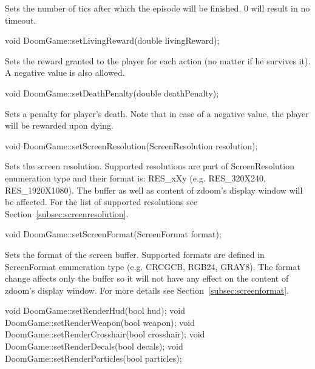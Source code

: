 \documentclass[english,bachelor,a4paper,twoside]{ppfcmthesis}
\begin{document}
Sets the number of tics after which the episode will be finished. 0 will result in no timeout.


\vspace{20pt}
\begin{clinee}
void DoomGame::setLivingReward(double livingReward);
\end{clinee}

Sets the reward granted to the player for each action (no matter if he survives it). A negative value is also allowed.


\vspace{20pt}
\begin{clinee}
void DoomGame::setDeathPenalty(double deathPenalty);
\end{clinee}

	Sets a penalty for player's death. Note that in case of a negative value, the player will be rewarded upon dying.


\vspace{20pt}
\begin{clinee}
void DoomGame::setScreenResolution(ScreenResolution resolution);
\end{clinee}

	Sets the screen resolution. Supported resolutions are part of ScreenResolution enumeration type and their format is: RES\_xXy (e.g. RES\_320X240, RES\_1920X1080). The buffer as well as content of zdoom's display window will be affected. For the list of supported resolutions see Section~\ref{subsec:screenresolution}.


\vspace{20pt}
\begin{clinee}
void DoomGame::setScreenFormat(ScreenFormat format);
\end{clinee}
	
	Sets the format of the screen buffer. Supported formats are defined in ScreenFormat enumeration type (e.g. CRCGCB, RGB24, GRAY8). The format change affects only the buffer so it will not have any effect on the content of zdoom's display window. For more details see Section~\ref{subsec:screenformat}.


\vspace{20pt}
\begin{clinee}       
void DoomGame::setRenderHud(bool hud);
void DoomGame::setRenderWeapon(bool weapon);
void DoomGame::setRenderCrosshair(bool crosshair);
void DoomGame::setRenderDecals(bool decals);
void DoomGame::setRenderParticles(bool particles);
\end{clinee}
\end{document}
